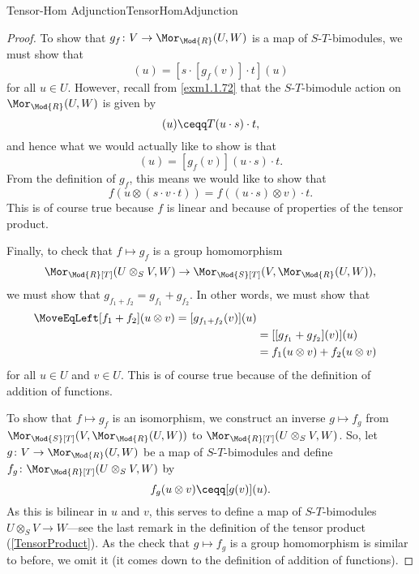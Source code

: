 \begin{thm}{Tensor-Hom Adjunction}{TensorHomAdjunction}
\begin{proof}
		To show that $g_f\colon V\rightarrow \Mor _{\Mod{R}}(U,W)$ is a map of $S$-$T$-bimodules, we must show that
		\begin{equation}
		[g_f(s\cdot v\cdot t)](u)=[s\cdot [g_f(v)]\cdot t](u)
		\end{equation}
		for all $u\in U$.  However, recall from \cref{exm1.1.72} that the $S$-$T$-bimodule action on $\Mor _{\Mod{R}}(U,W)$ is given by
		\begin{equation}
		[s\cdot T\cdot t](u)\ceqq T(u\cdot s)\cdot t,
		\end{equation}
		and hence what we would actually like to show is that
		\begin{equation}
		[g_f(s\cdot v\cdot t)](u)=[g_f(v)](u\cdot s)\cdot t.
		\end{equation}
		From the definition of $g_f$, this means we would like to show that
		\begin{equation}
		f\left( u\otimes (s\cdot v\cdot t)\right) =f\left( (u\cdot s)\otimes v\right) \cdot t.
		\end{equation}
		This is of course true because $f$ is linear and because of properties of the tensor product.
		
		Finally, to check that $f\mapsto g_f$ is a group homomorphism
		\begin{equation*}
		\Mor _{\Mod{R}[T]}(U\otimes _SV,W)\rightarrow \Mor _{\Mod{S}[T]}(V,\Mor _{\Mod{R}}(U,W)),
		\end{equation*}
		we must show that $g_{f_1+f_2}=g_{f_1}+g_{f_2}$.  In other words, we must show that
		\begin{equation}
		\begin{split}
		\MoveEqLeft
		[f_1+f_2](u\otimes v)=[g_{f_1+f_2}(v)](u) \\
		& =[[g_{f_1}+g_{f_2}](v)](u) \\
		& =f_1(u\otimes v)+f_2(u\otimes v)
		\end{split}
		\end{equation}
		for all $u\in U$ and $v\in U$.  This is of course true because of the definition of addition of functions.
		
		To show that $f\mapsto g_f$ is an isomorphism, we construct an inverse $g\mapsto f_g$ from $\Mor _{\Mod{S}[T]}(V,\Mor _{\Mod{R}}(U,W))$ to $\Mor _{\Mod{R}[T]}(U\otimes _SV,W)$.  So, let $g\colon V\rightarrow \Mor _{\Mod{R}}(U,W)$ be a map of $S$-$T$-bimodules and define $f_g\colon \Mor _{\Mod{R}[T]}(U\otimes _SV,W)$ by
		\begin{equation}
		f_g(u\otimes v)\ceqq [g(v)](u).
		\end{equation}
		As this is bilinear in $u$ and $v$, this serves to define a map of $S$-$T$-bimodules $U\otimes _SV\rightarrow W$---see the last remark in the definition of the tensor product (\cref{TensorProduct}).  As the check that $g\mapsto f_g$ is a group homomorphism is similar to before, we omit it (it comes down to the definition of addition of functions).
		

\end{proof}
\end{thm}
